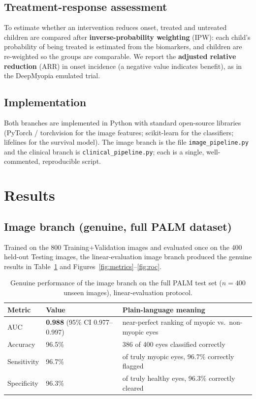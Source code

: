 \documentclass[11pt]{article}
\begin{document}
\subsection{Treatment-response assessment}
To estimate whether an intervention reduces onset, treated and untreated children
are compared after \textbf{inverse-probability weighting} (IPW): each child's
probability of being treated is estimated from the biomarkers, and children are
re-weighted so the groups are comparable. We report the \textbf{adjusted relative
reduction} (ARR) in onset incidence (a negative value indicates benefit), as in
the DeepMyopia emulated trial.

\subsection{Implementation}
Both branches are implemented in Python with standard open-source libraries
(PyTorch / torchvision for the image features; scikit-learn for the classifiers;
lifelines for the survival model). The image branch is the file
\texttt{image\_pipeline.py} and the clinical branch is
\texttt{clinical\_pipeline.py}; each is a single, well-commented, reproducible
script.

\section{Results}

\subsection{Image branch (genuine, full PALM dataset)}
Trained on the 800 Training+Validation images and evaluated once on the 400
held-out Testing images, the linear-evaluation image branch produced the genuine
results in Table~\ref{tab:img} and Figures~\ref{fig:metrics}--\ref{fig:roc}.

\begin{table}[H]
\centering
\caption{Genuine performance of the image branch on the full PALM test set
($n=400$ unseen images), linear-evaluation protocol.}
\label{tab:img}
\begin{tabular}{lll}
\toprule
\textbf{Metric} & \textbf{Value} & \textbf{Plain-language meaning}\\
\midrule
AUC & \textbf{0.988} (95\% CI 0.977--0.997) & near-perfect ranking of myopic vs.\ non-myopic eyes\\
Accuracy & 96.5\% & 386 of 400 eyes classified correctly\\
Sensitivity & 96.7\% & of truly myopic eyes, 96.7\% correctly flagged\\
Specificity & 96.3\% & of truly healthy eyes, 96.3\% correctly cleared\\
\bottomrule
\end{tabular}
\end{table}
\end{document}
